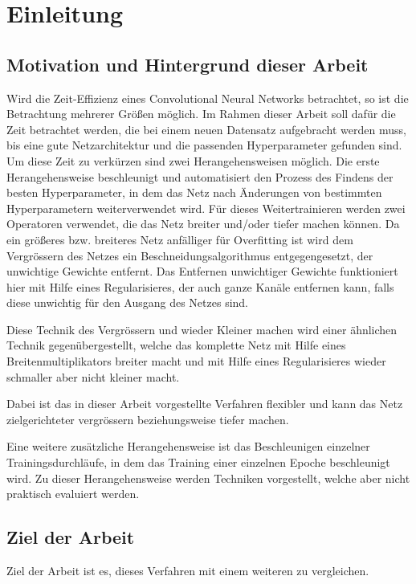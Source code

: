 \chapter{Einleitung}
\label{sec:EinleitungGesamt}

\section{Motivation und Hintergrund dieser Arbeit}
\color{blue1}
Wird die Zeit-Effizienz eines Convolutional Neural Networks betrachtet, so ist die Betrachtung mehrerer Größen möglich. Im Rahmen dieser Arbeit soll dafür die Zeit betrachtet werden, die bei einem neuen Datensatz aufgebracht werden muss, bis eine gute Netzarchitektur und die passenden Hyperparameter gefunden sind. Um diese Zeit zu verkürzen sind zwei Herangehensweisen möglich. Die erste Herangehensweise beschleunigt und automatisiert den Prozess des Findens der besten Hyperparameter, in dem das Netz nach Änderungen von bestimmten Hyperparametern weiterverwendet wird. Für dieses Weitertrainieren werden zwei Operatoren verwendet, die das Netz breiter und/oder tiefer machen können. Da ein größeres bzw. breiteres Netz anfälliger für Overfitting ist wird dem Vergrössern des Netzes ein Beschneidungsalgorithmus entgegengesetzt, der unwichtige Gewichte entfernt. Das Entfernen unwichtiger Gewichte funktioniert hier mit Hilfe eines Regularisieres, der auch ganze Kanäle entfernen kann, falls diese unwichtig für den Ausgang des Netzes sind. 


Diese Technik des Vergrössern und wieder Kleiner machen wird einer ähnlichen Technik gegenübergestellt, welche das komplette Netz mit Hilfe eines Breitenmultiplikators breiter macht und mit Hilfe eines Regularisieres wieder schmaller aber nicht kleiner macht.

Dabei ist das in dieser Arbeit vorgestellte Verfahren flexibler und kann das Netz zielgerichteter vergrössern beziehungsweise tiefer machen.

Eine weitere zusätzliche Herangehensweise ist das Beschleunigen einzelner Trainingsdurchläufe, in dem das Training einer einzelnen Epoche beschleunigt wird. Zu dieser Herangehensweise werden Techniken vorgestellt, welche aber nicht praktisch evaluiert werden. 

\section{Ziel der Arbeit}
Ziel der Arbeit ist es, dieses Verfahren mit einem weiteren zu vergleichen.


